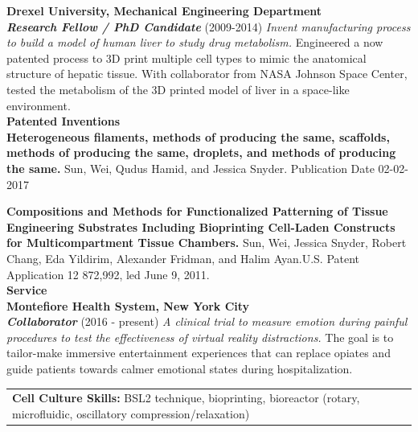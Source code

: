 \documentclass[11pt]{article}
\begin{document}
\begin{flushleft}
\vskip 0.1in
\textbf{Drexel University, Mechanical Engineering Department}\\
\textit{ \textbf{Research Fellow / PhD Candidate} } (2009-2014) 
\textit{Invent manufacturing process to build a model of human liver to study drug metabolism.} 
Engineered a now patented process to 3D print multiple cell types  to mimic the anatomical structure of hepatic tissue. With collaborator from NASA Johnson Space Center, tested the metabolism of the 3D printed model of liver in a space-like environment. \\



\vskip 0.1in
\textbf{ \Large Patented Inventions} \\

\textbf{Heterogeneous filaments, methods of producing the same, scaffolds, methods of producing the same, droplets, and methods of producing the same.} Sun, Wei, Qudus Hamid, and Jessica Snyder. Publication Date 02-02-2017 
\href{https://patentscope.wipo.int/search/en/detail.jsf?docId=WO2017019300}{\color{linkcolor}{https://patentscope.wipo.int/search/en/detail.jsf?docId=WO2017019300}} \\

\vskip 0.1in

\textbf{Compositions and Methods for Functionalized Patterning of Tissue Engineering Substrates Including Bioprinting Cell-Laden Constructs for Multicompartment Tissue Chambers.} Sun, Wei, Jessica Snyder, Robert Chang, Eda Yildirim, Alexander Fridman, and Halim Ayan.U.S. Patent Application 12 872,992, led June 9, 2011.    \href{https://www.freepatentsonline.com/y2011/0136162.html}{\color{linkcolor}{https://www.freepatentsonline.com/y2011/0136162.html}} \\

\vskip 0.1in
\textbf{ \Large Service} \\

\textbf{Montefiore Health System, New York City} \\
\textit { \textbf{Collaborator}} (2016 - present) 
\textit{A clinical trial to measure emotion during painful procedures to test the effectiveness of virtual reality distractions.} The goal is to tailor-make immersive entertainment experiences that can replace opiates and guide patients towards calmer emotional states during hospitalization. 




\begin{longtable}{ p{80mm} p{80mm} }
{
\textbf{Cell Culture Skills:}
BSL2 technique, bioprinting, bioreactor (rotary, microfluidic, oscillatory compression/relaxation)

}
\end{longtable}
\end{flushleft}
\end{document}

